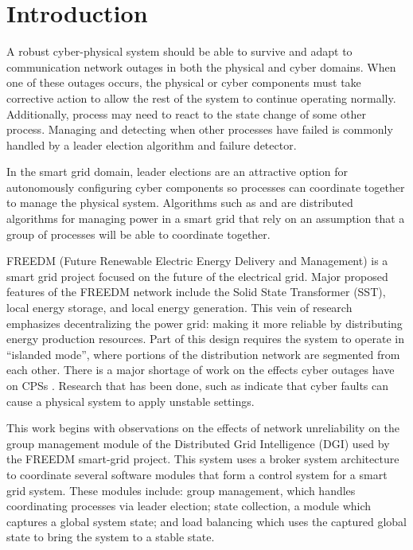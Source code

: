 \chapter{Introduction}
A robust cyber-physical system should be able to survive and adapt to communication network outages in both the physical and cyber domains.
When one of these outages occurs, the physical or cyber components must take corrective action to allow the rest of the system to continue operating normally.
Additionally, process may need to react to the state change of some other process.
Managing and detecting when other processes have failed is commonly handled by a leader election algorithm and failure detector.

In the smart grid domain, leader elections are an attractive option for autonomously configuring cyber components so processes can coordinate together to manage the physical system.
Algorithms such as \cite{LOADBALANCING} and \cite{INCREMENTALCONSENSUS} are distributed algorithms for managing power in a smart grid that rely on an assumption that a group of processes will be able to coordinate together. 

FREEDM (Future Renewable Electric Energy Delivery and Management) is a smart grid project focused on the future of the electrical grid.
Major proposed features of the FREEDM network include the Solid State Transformer (SST), local energy storage, and local energy generation\cite{FREEDMMIGRATION}.
This vein of research emphasizes decentralizing the power grid: making it more reliable by distributing energy production resources.
Part of this design requires the system to operate in ``islanded mode'', where portions of the distribution network are segmented from each other.
There is a major shortage of work on the effects cyber outages have on CPSs \cite{CYBERRESEARCHCALL} \cite{SMARTGRIDBENEFITS}.
Research that has been done, such as \cite{HARINI} indicate that cyber faults can cause a physical system to apply unstable settings.

This work begins with observations on the effects of network unreliability on the group management module of the Distributed Grid Intelligence (DGI) used by the FREEDM smart-grid project.
This system uses a broker system architecture to coordinate several software modules that form a control system for a smart grid system.
These modules include: group management, which handles coordinating processes via leader election; state collection, a module which captures a global system state; and load balancing which uses the captured global state to bring the system to a stable state.

